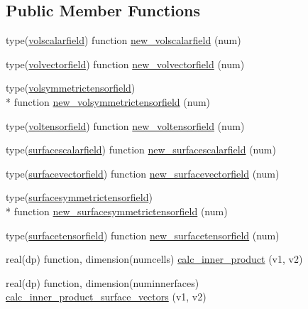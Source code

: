 \subsection*{Public Member Functions}
\begin{DoxyCompactItemize}
\item 
type(\hyperlink{structtensor__fields_1_1volscalarfield}{volscalarfield}) function \hyperlink{classtensor__fields_a596d7733e2f19fb55fe7f09b704d4a16}{new\-\_\-volscalarfield} (num)
\item 
type(\hyperlink{structtensor__fields_1_1volvectorfield}{volvectorfield}) function \hyperlink{classtensor__fields_a664e85f0e946cc3941933db9794fefe5}{new\-\_\-volvectorfield} (num)
\item 
type(\hyperlink{structtensor__fields_1_1volsymmetrictensorfield}{volsymmetrictensorfield}) \\*
function \hyperlink{classtensor__fields_a6b2a7e99a62e11dd6df66ebe56bbbd6b}{new\-\_\-volsymmetrictensorfield} (num)
\item 
type(\hyperlink{structtensor__fields_1_1voltensorfield}{voltensorfield}) function \hyperlink{classtensor__fields_a62f581f9e29e80f5ed7d3d2b9539398c}{new\-\_\-voltensorfield} (num)
\item 
type(\hyperlink{structtensor__fields_1_1surfacescalarfield}{surfacescalarfield}) function \hyperlink{classtensor__fields_a43dbadf69f0711e9f54b26b273a59c48}{new\-\_\-surfacescalarfield} (num)
\item 
type(\hyperlink{structtensor__fields_1_1surfacevectorfield}{surfacevectorfield}) function \hyperlink{classtensor__fields_a4d60ee914ac1da3fd430425a2e9ae35d}{new\-\_\-surfacevectorfield} (num)
\item 
type(\hyperlink{structtensor__fields_1_1surfacesymmetrictensorfield}{surfacesymmetrictensorfield}) \\*
function \hyperlink{classtensor__fields_aa4a670d5719348306b889b932ccf7269}{new\-\_\-surfacesymmetrictensorfield} (num)
\item 
type(\hyperlink{structtensor__fields_1_1surfacetensorfield}{surfacetensorfield}) function \hyperlink{classtensor__fields_a557464fc85d557fc094c7b27cb83696b}{new\-\_\-surfacetensorfield} (num)
\item 
real(dp) function, dimension(numcells) \hyperlink{classtensor__fields_a9867b88333b6b56c6a33a18da09aa8bf}{calc\-\_\-inner\-\_\-product} (v1, v2)
\item 
real(dp) function, dimension(numinnerfaces) \hyperlink{classtensor__fields_a5307165e5f57a46d66e4b251962d8c9c}{calc\-\_\-inner\-\_\-product\-\_\-surface\-\_\-vectors} (v1, v2)

\end{DoxyCompactItemize}
